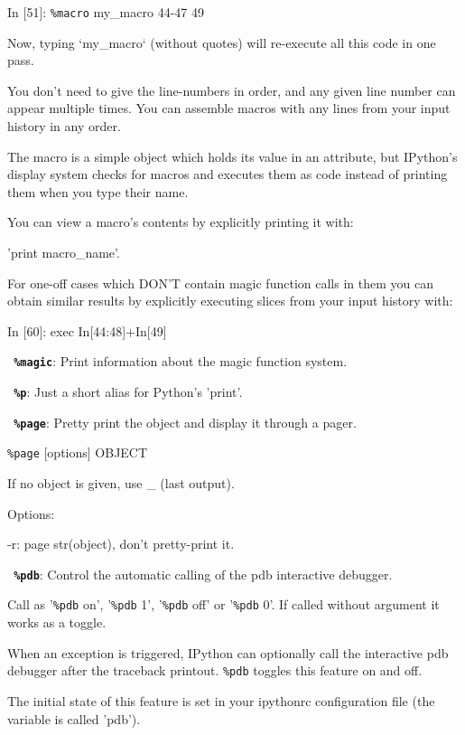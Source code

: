           In [51]: \texttt{\%macro} my\_macro 44-47 49

        Now, typing `my\_macro` (without quotes) will re-execute all this code
        in one pass.

        You don't need to give the line-numbers in order, and any given line
        number can appear multiple times. You can assemble macros with any
        lines from your input history in any order.

        The macro is a simple object which holds its value in an attribute,
        but IPython's display system checks for macros and executes them as
        code instead of printing them when you type their name.

        You can view a macro's contents by explicitly printing it with:
        
          'print macro\_name'.

        For one-off cases which DON'T contain magic function calls in them you
        can obtain similar results by explicitly executing slices from your
        input history with:

          In [60]: exec In[44:48]+In[49]

\bigskip
\texttt{\textbf{ \%magic}}:
	Print information about the magic function system.

\bigskip
\texttt{\textbf{ \%p}}:
	Just a short alias for Python's 'print'.

\bigskip
\texttt{\textbf{ \%page}}:
	Pretty print the object and display it through a pager.
        
        \texttt{\%page} [options] OBJECT

        If no object is given, use \_ (last output).
        
        Options:

          -r: page str(object), don't pretty-print it.

\bigskip
\texttt{\textbf{ \%pdb}}:
	Control the automatic calling of the pdb interactive debugger.

        Call as '\texttt{\%pdb} on', '\texttt{\%pdb} 1', '\texttt{\%pdb} off' or '\texttt{\%pdb} 0'. If called without
        argument it works as a toggle.

        When an exception is triggered, IPython can optionally call the
        interactive pdb debugger after the traceback printout. \texttt{\%pdb} toggles
        this feature on and off.

        The initial state of this feature is set in your ipythonrc
        configuration file (the variable is called 'pdb').

